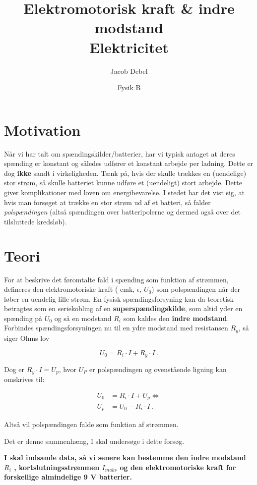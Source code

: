\documentclass[a4paper, 12pt]{article}
\author{Jacob Debel}
\date{Fysik B}
\title{Elektromotorisk kraft \& indre modstand\\\medskip
\large Elektricitet}
\begin{document}
\maketitle

\section*{Motivation}
\label{sec:orgbc3f3c3}
Når vi har talt om spændingskilder/batterier, har vi typisk antaget at deres spænding er konstant og således udfører et konstant arbejde per ladning. Dette er dog \textbf{ikke} sandt i virkeligheden.
Tænk på, hvis der skulle trækkes en (uendelige) stor strøm, så skulle batteriet kunne udføre et (uendeligt) stort arbejde. Dette giver komplikationer med loven om energibevarelse.
I stedet har det vist sig, at hvis man forsøget at trække en stor strøm ud af et batteri, så falder \emph{polspændingen} (altså spændingen over batteripolerne og dermed også over det tilsluttede kredsløb).

\section*{Teori}
\label{sec:orgddadf50}
For at beskrive det føromtalte fald i spænding som funktion af strømmen, defineres den elektromotoriske kraft ( emk, \(\epsilon\), \(U_0\)) som polspændingen når der løber en uendelig lille strøm.
En fysisk spændingsforsyning kan da teoretisk betragtes som en seriekobling af en \textbf{superspændingskilde}, som altid yder en spænding på \(U_0\) og så en modstand \(R_i\) som kaldes den \textbf{indre modstand}.
Forbindes spændingsforsyningen nu til en ydre modstand med resistansen \(R_y\), så siger Ohms lov

$$U_0 = R_i \cdot I + R_y \cdot I\,.$$

Dog er \(R_y \cdot I=U_p\), hvor \(U_P\) er polspændingen og ovenstående ligning kan omskrives til:

\begin{align*}
U_0 &= R_i \cdot I + U_p \iff \\
U_p &= U_0 - R_i \cdot I \,.
\end{align*}

Altså vil polspændingen falde som funktion af strømmen.

Det er denne sammenhæng, I skal undersøge i dette forsøg.

\textbf{I skal indsamle data, så vi senere kan bestemme den indre modstand \(R_i\) , kortslutningsstrømmen \(I_{maks}\) og den elektromotoriske kraft for forskellige almindelige 9 V batterier.}
\end{document}
